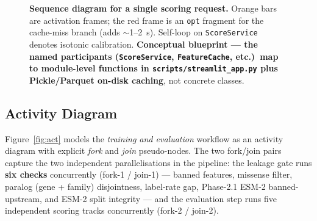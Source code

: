 \documentclass[11pt,a4paper,oneside]{report}
\begin{document}
\begin{figure}[htbp]
\caption[Sequence diagram]{\textbf{Sequence diagram for a
single scoring request.} Orange bars are activation
frames; the red frame is an \texttt{opt} fragment for the
cache-miss branch (adds $\sim$1--2~s). Self-loop on
\texttt{ScoreService} denotes isotonic calibration.
\textbf{Conceptual blueprint --- the named participants
(\texttt{ScoreService}, \texttt{FeatureCache}, etc.)\ map
to module-level functions in
\texttt{scripts/streamlit\_app.py} plus Pickle/Parquet
on-disk caching}, not concrete classes.}
\label{fig:seq}
\end{figure}

\subsection{Activity Diagram}
\label{sec:uml-activity}

Figure~\ref{fig:act} models the \emph{training and
evaluation} workflow as an activity diagram with explicit
\emph{fork} and \emph{join} pseudo-nodes. The two fork/join
pairs capture the two independent parallelisations in the
pipeline: the leakage gate runs \textbf{six checks}
concurrently (fork-1 / join-1) --- banned features, missense
filter, paralog (gene + family) disjointness, label-rate
gap, Phase-2.1 ESM-2 banned-upstream, and ESM-2 split
integrity --- and the evaluation step runs five
independent scoring tracks concurrently (fork-2 / join-2).
\end{document}
